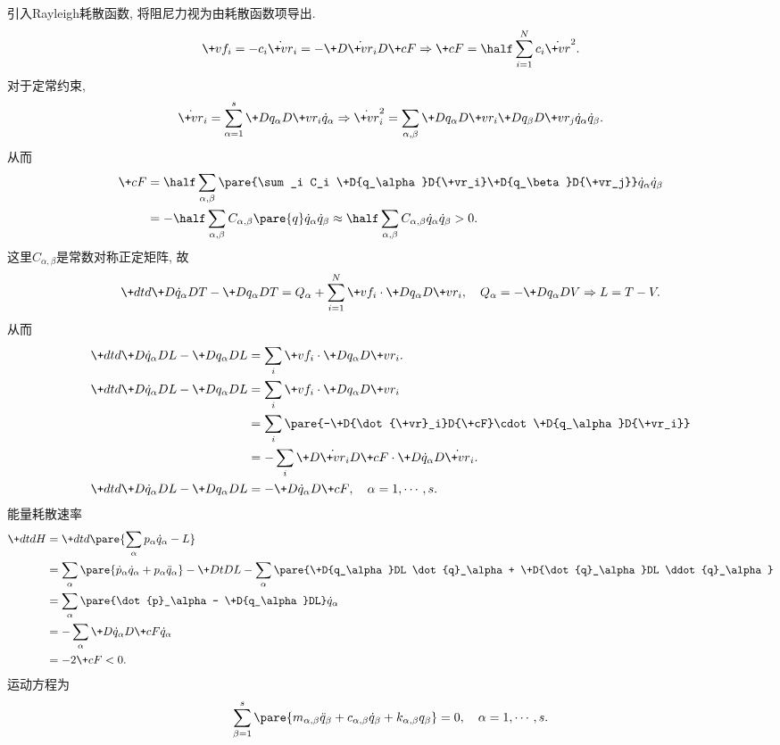 \documentclass{ctexart}
\begin{document}
引入Rayleigh耗散函数, 将阻尼力视为由耗散函数项导出.
\[ \+vf_i = -c_i \dot{\+vr}_i = -\+D{\dot{\+vr}_i}D{\+cF} \Rightarrow \+cF = \half \sum_{i=1}^N c_i \dot{\+vr}^2. \]
对于定常约束,
\[ \dot{\+vr}_i = \sum_{\alpha=1}^s \+D{q_\alpha}D{\+vr_i} \dot{q}_\alpha \Rightarrow \dot{\+vr}_i^2 = \sum_{\alpha,\beta} \+D{q_\alpha}D{\+vr_i}\+D{q_\beta}D{\+vr_j}\dot{q}_\alpha \dot{q}_\beta. \]
从而
\begin{align*}
    \+cF &= \half\sum_{\alpha,\beta} \pare{\sum_i C_i \+D{q_\alpha}D{\+vr_i}\+D{q_\beta}D{\+vr_j}} \dot{q}_\alpha \dot{q}_\beta \\ &= -\half \sum_{\alpha,\beta} C_{\alpha,\beta}\pare{q} \dot{q}_\alpha \dot{q}_\beta \approx \half \sum_{\alpha,\beta} C_{\alpha,\beta} \dot{q}_\alpha \dot{q}_\beta > 0.
\end{align*}
这里$C_{\alpha,\beta}$是常数对称正定矩阵, 故
\[ \+dtd{} \+D{\dot{q}_\alpha}DT - \+D{q_\alpha}DT = Q_\alpha + \sum_{i=1}^N \+vf_i \cdot \+D{q_\alpha}D{\+vr_i},\quad Q_\alpha = -\+D{q_\alpha}DV \Rightarrow L=T-V. \]
从而
\begin{align*}
    \+dtd{} \+D{\dot{q}_\alpha}DL - \+D{q_\alpha}DL &= \sum_i \+vf_i \cdot \+D{q_\alpha}D{\+vr_i}. \\
    \+dtd{} \+D{\dot{q}_\alpha}DL - \+D{q_\alpha}DL &= \sum_i \+vf_i \cdot \+D{q_\alpha}D{\+vr_i} \\
    &= \sum_i \pare{-\+D{\dot{\+vr}_i}D{\+cF}\cdot \+D{q_\alpha}D{\+vr_i}} \\
    &= -\sum_i \+D{\dot{\+vr}_i}D{\+cF} \cdot \+D{\dot{q}_\alpha}D{\dot{\+vr}_i}. \\
    \+dtd{} \+D{\dot{q}_\alpha}DL - \+D{q_\alpha}DL &= - \+D{\dot{q}_\alpha}D{\+cF},\quad \alpha = 1,\cdots,s.
\end{align*}
能量耗散速率
\begin{align*}
    \+dtdH &= \+dtd{} \pare{\sum_\alpha p_\alpha \dot{q}_\alpha - L} \\
    &= \sum_\alpha \pare{\dot{p}_\alpha \dot{q}_\alpha + p_\alpha \ddot{q}_\alpha} - \+DtDL - \sum_\alpha\pare{\+D{q_\alpha}DL \dot{q}_\alpha + \+D{\dot{q}_\alpha}DL \ddot{q}_\alpha} \\
    &= \sum_\alpha \pare{\dot{p}_\alpha - \+D{q_\alpha}DL} \dot{q}_\alpha \\
    &= -\sum_\alpha \+D{\dot{q}_\alpha}D{\+cF} \dot{q}_\alpha \\
    &= -2\+cF < 0.
\end{align*}
运动方程为
\[ \sum_{\beta = 1}^s \pare{m_{\alpha,\beta}\ddot{q}_\beta + c_{\alpha,\beta}\dot{q}_\beta + k_{\alpha,\beta}q_\beta} = 0,\quad \alpha = 1,\cdots,s. \]
\end{document}
